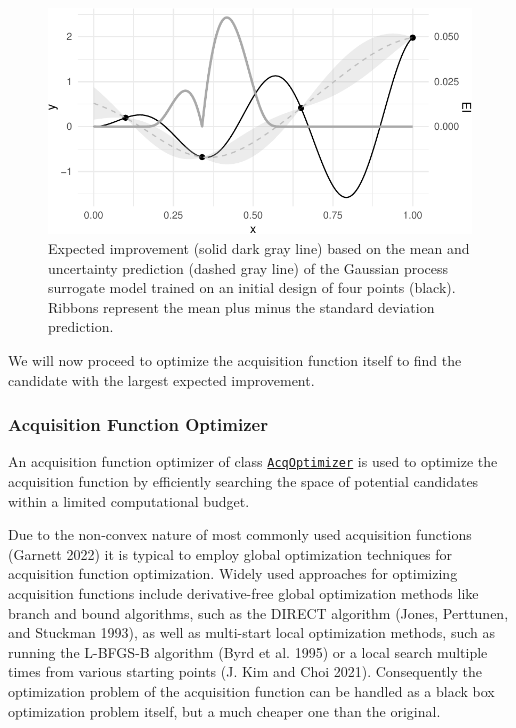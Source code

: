 \begin{figure}[H]

{\centering \includegraphics[width=1\textwidth,height=\textheight]{chapters/chapter5/advanced_tuning_methods_and_black_box_optimization_files/figure-pdf/fig-bayesian-optimization-ei-1.pdf}

}

\caption{\label{fig-bayesian-optimization-ei}Expected improvement (solid
dark gray line) based on the mean and uncertainty prediction (dashed
gray line) of the Gaussian process surrogate model trained on an initial
design of four points (black). Ribbons represent the mean plus minus the
standard deviation prediction.}

\end{figure}

We will now proceed to optimize the acquisition function itself to find
the candidate with the largest expected improvement.

\hypertarget{sec-bayesian-optimization-acquisitionopt}{%
\subsubsection{Acquisition Function
Optimizer}\label{sec-bayesian-optimization-acquisitionopt}}

An acquisition function optimizer
of class
\href{https://mlr3mbo.mlr-org.com/reference/AcqOptimizer.html}{\texttt{AcqOptimizer}}
is used to optimize the acquisition function by efficiently searching
the space of potential candidates within a limited computational budget.

Due to the non-convex nature of most commonly used acquisition functions
(Garnett 2022) it is typical to employ global optimization techniques
for acquisition function optimization. Widely used approaches for
optimizing acquisition functions include derivative-free global
optimization methods like branch and bound algorithms, such as the
DIRECT algorithm (Jones, Perttunen, and Stuckman 1993), as
well as multi-start local optimization methods, such as running the
L-BFGS-B algorithm (Byrd et al. 1995) or a local search
multiple times from various starting points (J. Kim and Choi 2021).
Consequently the optimization problem of the acquisition function can be
handled as a black box optimization problem itself, but a much cheaper
one than the original.

